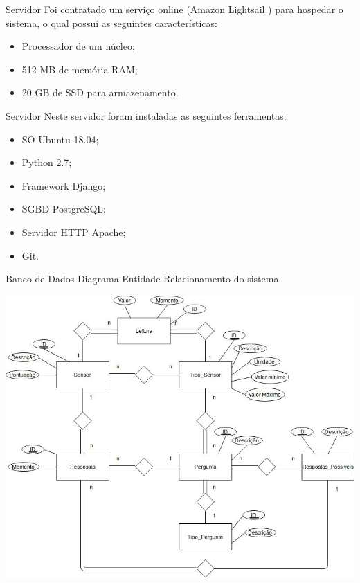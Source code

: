 \documentclass{beamer}
\begin{document}
  \begin{frame}{Servidor}
    Foi contratado um serviço online (Amazon Lightsail \cite{lightsail}) para hospedar o sistema, o qual possui as seguintes características:
    \begin{itemize}
      \item Processador de um núcleo;
      \item 512 MB de memória RAM;
      \item 20 GB de SSD para armazenamento.
    \end{itemize}
  \end{frame}
  \begin{frame}{Servidor}
    Neste servidor foram instaladas as seguintes ferramentas:
    \begin{itemize}
      \item SO Ubuntu 18.04;
      \item Python 2.7;
      \item Framework Django;
      \item SGBD PostgreSQL;
      \item Servidor HTTP Apache;
      \item Git.
    \end{itemize}
  \end{frame}

  \begin{frame}{Banco de Dados}
    Diagrama Entidade Relacionamento do sistema
    \begin{center}
    \includegraphics[scale=0.3]{tccDER}
    \end{center}
  \end{frame}
\end{document}
